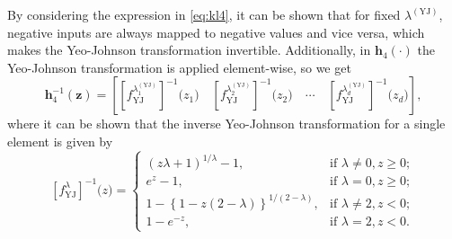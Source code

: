 \documentclass{statsmsc}
\begin{document}
{By considering the expression in \cref{eq:kl4}, it can be shown that for fixed
$\lambda^{(\textrm{YJ})}$, negative inputs are always
mapped to negative values and vice versa, which makes the Yeo-Johnson transformation invertible.
Additionally, in $\mathbf{h}_4(\cdot)$ the Yeo-Johnson transformation is applied element-wise, so
we get
\begin{equation}
    \mathbf{h}_4^{-1}(\mathbf{z})=\left[
        \left[f_{\textrm{YJ}}^{\lambda_1^{(\textrm{YJ})}}\right]^{-1}\bigg(z_1\bigg) \quad
        \left[f_{\textrm{YJ}}^{\lambda_2^{(\textrm{YJ})}}\right]^{-1}\bigg(z_2\bigg) \quad \cdots \quad
    \left[f_{\textrm{YJ}}^{\lambda_d^{(\textrm{YJ})}}\right]^{-1}\bigg(z_d\bigg) \right],
\end{equation}
where it can be shown that the inverse Yeo-Johnson transformation for a single element is given by
\begin{equation}
    \left[f_{\textrm{YJ}}^\lambda\right]^{-1}\bigg(z\bigg)= \left\{
    \begin{array}{ll}
        (z \lambda + 1)^{1/\lambda} -1, & \textrm{if } \lambda \neq 0, z \geq 0; \\
        e^z-1, & \textrm{if } \lambda = 0, z \geq 0;  \\
        1-\left\{1-z(2-\lambda)\right\}^{1/ (2-\lambda)} , & \textrm{if } \lambda \neq 2, z < 0; \\
        1-e^{-z}, & \textrm{if } \lambda=2, z < 0.
    \end{array}
    \right.
\end{equation}

}
\end{document}
